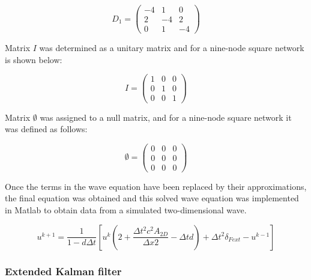 \documentclass[12pt, a4paper]{article} %
\begin{document}
\begin{equation} \label{eqn:matrixD2}
    D_{1} = 
        \begin{pmatrix}
            -4 & 1 & 0\\
            2 & -4 & 2\\
            0 & 1 & -4
    \end{pmatrix}
\end{equation}

Matrix $I$ was determined as a unitary matrix and for a nine-node square network is shown below:

\begin{equation} \label{eqn:matrixI}
    I = 
        \begin{pmatrix}
            1 & 0 & 0\\
            0 & 1 & 0\\
            0 & 0 & 1
    \end{pmatrix}
\end{equation}

Matrix $\emptyset$ was assigned to a null matrix, and for a nine-node square network it was defined as follows:

\begin{equation} \label{eqn:matrixI}
    \emptyset = 
        \begin{pmatrix}
            0 & 0 & 0\\
            0 & 0 & 0\\
            0 & 0 & 0
    \end{pmatrix}
\end{equation}

Once the terms in the wave equation have been replaced by their approximations, the final equation was obtained and this solved wave equation was implemented in Matlab to obtain data from a simulated two-dimensional wave.

\begin{equation} \label{eqn:uk+1}
   u^{k + 1} = \frac{1}{1 - d\Delta t} \left[u^{k} \left(2+ \frac{\Delta t^{2} c^{2} A_{2D}}{\Delta x{2}} - \Delta t d\right) + \Delta t^{2} \delta_{Fext} - u^{k - 1}\right]
\end{equation}

\subsubsection{Extended Kalman filter}
\end{document}
